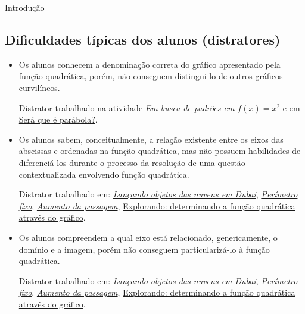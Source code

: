 \begin{apresentacao}{Introdução}
\subsection{Dificuldades típicas dos alunos (distratores)}

\begin{itemize}

\item {} 
Os alunos conhecem a denominação correta do gráfico apresentado pela função quadrática, porém, não conseguem distingui-lo de outros gráficos curvilíneos. \citep{alexandre2009}

Distrator trabalhado na atividade \hyperref[\detokenize{AF209-2:ativ-funcao-quadratica-investigando-x-a-2}]{\textit{Em busca de padrões em \(f(x)=x^2\)}} e em \hyperref[\detokenize{AF209-11:sub-funcao-quadratica-voce-sabia-catenaria}]{Será que é parábola?}.

\item {} 
Os alunos sabem, conceitualmente, a relação existente entre os eixos das abscissas e ordenadas na função quadrática, mas não possuem habilidades de diferenciá-los durante o processo da resolução de uma questão contextualizada envolvendo função quadrática. \citep{alexandre2009}

Distrator trabalhado em: \hyperref[\detokenize{AF209-0:ativ-funcao-quadratica-lancamento-vertical-em-dubai}]{\textit{Lançando objetos das nuvens em Dubai}}, \hyperref[\detokenize{AF209-3:sub-ativ-funcao-quadratica-perimetro-fixo}]{\textit{Perímetro fixo}}, \hyperref[\detokenize{AF209-7:ativ-funcao-quadratica-aumento-passagem}]{\textit{Aumento da passagem}}, \hyperref[\detokenize{AF209-9:sec-funcao-quadratica-obtendo-lei-do-grafico}]{Explorando: determinando a função quadrática através do gráfico}.

\item {} 
Os alunos compreendem a qual eixo está relacionado, genericamente, o domínio e a imagem, porém não conseguem particularizá-lo à função quadrática. \citep{alexandre2009}

Distrator trabalhado em: \hyperref[\detokenize{AF209-0:ativ-funcao-quadratica-lancamento-vertical-em-dubai}]{\textit{Lançando objetos das nuvens em Dubai}}, \hyperref[\detokenize{AF209-3:sub-ativ-funcao-quadratica-perimetro-fixo}]{\textit{Perímetro fixo}}, \hyperref[\detokenize{AF209-7:ativ-funcao-quadratica-aumento-passagem}]{\textit{Aumento da passagem}}, \hyperref[\detokenize{AF209-9:sec-funcao-quadratica-obtendo-lei-do-grafico}]{Explorando: determinando a função quadrática através do gráfico}.


\end{itemize}
\end{apresentacao}
